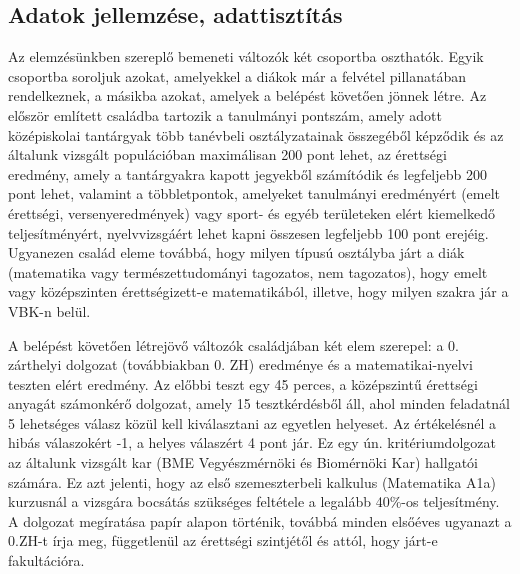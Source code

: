 \documentclass[12pt]{article}
\begin{document}
\subsection{Adatok jellemzése, adattisztítás}

Az elemzésünkben szereplő bemeneti változók két csoportba oszthatók. Egyik csoportba soroljuk azokat, amelyekkel a diákok már a felvétel pillanatában rendelkeznek, a másikba azokat, amelyek a belépést követően jönnek létre. Az először említett családba tartozik a tanulmányi pontszám, amely adott középiskolai tantárgyak több tanévbeli osztályzatainak összegéből képződik és az általunk vizsgált populációban maximálisan 200 pont lehet, az érettségi eredmény, amely a tantárgyakra kapott jegyekből számítódik és legfeljebb 200 pont lehet, valamint a többletpontok, amelyeket tanulmányi eredményért (emelt érettségi, versenyeredmények) vagy sport- és egyéb területeken elért kiemelkedő teljesítményért, nyelvvizsgáért lehet kapni összesen legfeljebb 100 pont erejéig. Ugyanezen család eleme továbbá, hogy milyen típusú osztályba járt a diák (matematika vagy természettudományi tagozatos, nem tagozatos), hogy emelt vagy középszinten érettségizett-e matematikából, illetve, hogy milyen szakra jár a VBK-n belül.

A belépést követően létrejövő változók családjában két elem szerepel: a 0. zárthelyi dolgozat (továbbiakban 0. ZH) eredménye és a matematikai-nyelvi teszten elért eredmény. Az előbbi teszt egy 45 perces, a középszintű érettségi anyagát számonkérő dolgozat, amely 15 tesztkérdésből áll, ahol minden feladatnál 5 lehetséges válasz közül kell kiválasztani az egyetlen helyeset. Az értékelésnél a hibás válaszokért -1, a helyes válaszért 4 pont jár. Ez egy ún. kritériumdolgozat az általunk vizsgált kar (BME Vegyészmérnöki és Biomérnöki Kar) hallgatói számára. Ez azt jelenti, hogy az első szemeszterbeli kalkulus (Matematika A1a) kurzusnál a vizsgára bocsátás szükséges feltétele a legalább 40\%-os teljesítmény. A dolgozat megíratása papír alapon történik, továbbá minden elsőéves ugyanazt a 0.ZH-t írja meg, függetlenül az érettségi szintjétől és attól, hogy járt-e fakultációra.
\end{document}
